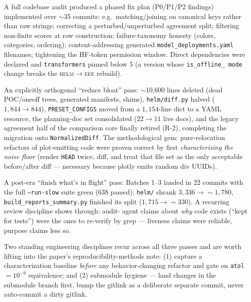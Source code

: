 \documentclass[11pt]{report}
\newcommand{\eeeshort}{\textsc{eee}\xspace}
\newcommand{\code}[1]{\texttt{#1}}
\begin{document}
\begin{description}[style=nextline,leftmargin=1.25em]
  \item[Correctness audit (2026-07-02/03).] A full codebase audit produced a
        phased fix plan (P0/P1/P2 findings) implemented over $\sim$35 commits: e.g.\
        matching/joining on canonical keys rather than raw strings; correcting a
        perturbed/unperturbed agreement split; filtering non-finite scores at row
        construction; failure-taxonomy honesty (colors, categories, ordering);
        content-addressing generated \code{model\_deployments.yaml} filenames;
        tightening the HF-token permission window. Direct dependencies were declared
        and \code{transformers} pinned below 5 (a version whose \code{is\_offline\_
        mode} change breaks the \textsc{helm}$\to$\eeeshort rebuild).
  \item[Simplicity audit (2026-07-06).] An explicitly orthogonal ``reduce bloat''
        pass: $\sim$10{,}600 lines deleted (dead POC/oneoff trees, generated
        manifests, shims), \code{helm/diff.py} halved ($1{,}844\to844$),
        \code{PRESET\_CONFIGS} moved from a $1{,}154$-line dict to a YAML resource,
        the planning-doc set consolidated ($22\to11$ live docs), and the legacy
        agreement half of the comparison core finally retired (R-2), completing the
        migration onto \code{NormalizedDiff}. The methodological gem: pure-relocation
        refactors of plot-emitting code were proven correct by first
        \emph{characterizing the noise floor} (render \code{HEAD} twice, diff, and
        treat that file set as the only acceptable before/after diff --- necessary
        because plotly emits random div UUIDs).
  \item[Fourth simplification pass (2026-07-12).] A post-era ``finish what's in
        flight'' pass: Batches 1--3 landed in $22$ commits with the full
        \code{--run-slow} suite green ($638$ passed); \code{helm/} shrank
        $3{,}336\to\sim1{,}780$, \code{build\_reports\_summary.py} finished its split
        ($1{,}715\to\sim330$). A recurring review discipline shows through: audit-
        agent claims about \emph{why} code exists (``kept for tests'') were the ones
        to re-verify by grep --- liveness claims were reliable, purpose claims less
        so.
\end{description}

Two standing engineering disciplines recur across all three passes and are worth
lifting into the paper's reproducibility-methods note: (1) capture a
characterization baseline \emph{before} any behavior-changing refactor and gate on
\code{atol}$=10^{-9}$ equivalence; and (2) submodule hygiene --- land changes in the
submodule branch first, bump the gitlink as a deliberate separate commit, never
auto-commit a dirty gitlink.
\end{document}
